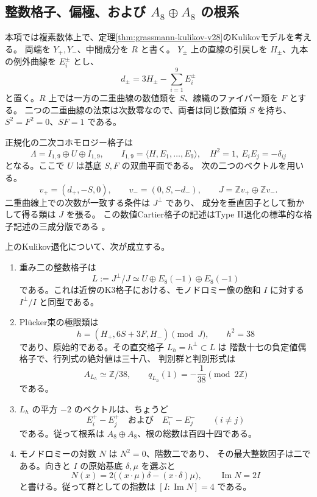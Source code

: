 \subsection{整数格子、偏極、および $A_8\oplus A_8$ の根系}
\label{subsec:kulikov-lattice-v29}

本項では複素数体上で、定理\ref{thm:grassmann-kulikov-v28}のKulikovモデルを考える。
両端を $Y_+,Y_-$、中間成分を $R$ と書く。
$Y_\pm$ 上の直線の引戻しを $H_\pm$、九本の例外曲線を $E_i^\pm$ とし、
\[
 d_\pm=3H_\pm-\sum_{i=1}^9 E_i^\pm
\]
と置く。$R$ 上では一方の二重曲線の数値類を $S$、線織のファイバー類を $F$ とする。
二つの二重曲線の法束は次数零なので、両者は同じ数値類 $S$ を持ち、
$S^2=F^2=0$、$SF=1$ である。

正規化の二次コホモロジー格子は
\[
 \Lambda=I_{1,9}\oplus U\oplus I_{1,9},\qquad
 I_{1,9}=\langle H,E_1,\ldots,E_9\rangle,
 \quad H^2=1,\ E_iE_j=-\delta_{ij}
\]
となる。ここで $U$ は基底 $S,F$ の双曲平面である。
次の二つのベクトルを用いる。
\[
 v_+=(d_+,-S,0),\qquad v_-=(0,S,-d_-),\qquad
 J=\mathbb Z v_+\oplus\mathbb Z v_-.
\]
二重曲線上での次数が一致する条件は $J^\perp$ であり、
成分を垂直因子として動かして得る類は $J$ を張る。
この数値Cartier格子の記述はType II退化の標準的な格子記述の三成分版である
\cite[\S2]{KondoTypeII}。

\begin{theorem}[偏極付き極限格子]
\label{thm:kulikov-lattice-v29}
上のKulikov退化について、次が成立する。
\begin{enumerate}
\item 重み二の整数格子は
\[
 L:=J^\perp/J\simeq U\oplus E_8(-1)\oplus E_8(-1)
\]
である。これは近傍のK3格子における、モノドロミー像の飽和 $I$ に対する
$I^\perp/I$ と同型である。
\item Pl\"ucker束の極限類は
\[
 h=(H_+,6S+3F,H_-)\pmod J,
 \qquad h^2=38
\]
であり、原始的である。その直交格子 $L_h=h^\perp\subset L$ は
階数十七の負定値偶格子で、行列式の絶対値は三十八、
判別群と判別形式は
\[
 A_{L_h}\simeq\mathbb Z/38,\qquad q_{L_h}(1)=-\frac1{38}\pmod{2\mathbb Z}
\]
である。
\item $L_h$ の平方 $-2$ のベクトルは、ちょうど
\[
 E_i^+-E_j^+\quad\text{および}\quad E_i^--E_j^-
 \qquad(i\ne j)
\]
である。従って根系は $A_8\oplus A_8$、根の総数は百四十四である。
\item モノドロミーの対数 $N$ は $N^2=0$、階数二であり、
その最大整数因子は二である。向きと $I$ の原始基底 $\delta,\mu$ を選ぶと
\[
 N(x)=2\bigl((x\cdot\mu)\delta-(x\cdot\delta)\mu\bigr),
 \qquad \operatorname{Im}N=2I
\]
と書ける。従って群としての指数は $[I:\operatorname{Im}N]=4$ である。
\end{enumerate}
\end{theorem}

